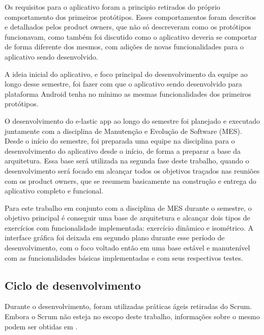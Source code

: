 Os requisitos para o aplicativo foram a principio retirados do próprio comportamento dos primeiros protótipos. Esses comportamentos foram descritos e detalhados pelos product owners, que não só descreveram como os protótipos funcionavam, como também foi discutido como o aplicativo deveria se comportar de forma diferente dos mesmos, com adições de novas funcionalidades para o aplicativo sendo desenvolvido.

A ideia inicial do aplicativo, e foco principal do desenvolvimento da equipe ao longo desse semestre, foi fazer com que o aplicativo sendo desenvolvido para plataforma Android tenha no mínimo as mesmas funcionalidades dos primeiros protótipos. 

O desenvolvimento do e-lastic app ao longo do semestre foi planejado e executado juntamente com a disciplina de Manutenção e Evolução de Software (MES). Desde o início do semestre, foi preparada uma equipe na disciplina para o desenvolvimento do aplicativo desde o início, de forma a preparar a base da arquitetura. Essa base será utilizada na segunda fase deste trabalho, quando o desenvolvimento será focado em alcançar todos os objetivos traçados nas reuniões com os product owners, que se resumem basicamente na construção e entrega do aplicativo completo e funcional.

Para este trabalho em conjunto com a disciplina de MES durante o semestre, o objetivo principal é conseguir uma base de arquitetura e alcançar dois tipos de exercícios com funcionalidade implementada: exercício dinâmico e isométrico. A interface gráfica foi deixada em segundo plano durante esse período de desenvolvimento, com o foco voltado então em uma base estável e manutenível com as funcionalidades básicas implementadas e com seus respectivos testes.

\subsection{Ciclo de desenvolvimento}		

Durante o desenvolvimento, foram utilizadas práticas ágeis retiradas do Scrum. Embora o Scrum não esteja no escopo deste trabalho, informações sobre o mesmo podem ser obtidas em .

